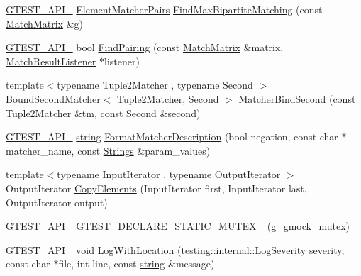 \begin{DoxyCompactItemize}
\item 
\hyperlink{gtest-port_8h_aa73be6f0ba4a7456180a94904ce17790}{G\+T\+E\+S\+T\+\_\+\+A\+P\+I\+\_\+} \hyperlink{namespacetesting_1_1internal_a0038618710c01a71150887dc7cfb0a29}{Element\+Matcher\+Pairs} \hyperlink{namespacetesting_1_1internal_ae30bd8357c179334b2b09b0d689efccc}{Find\+Max\+Bipartite\+Matching} (const \hyperlink{classtesting_1_1internal_1_1MatchMatrix}{Match\+Matrix} \&g)
\item 
\hyperlink{gtest-port_8h_aa73be6f0ba4a7456180a94904ce17790}{G\+T\+E\+S\+T\+\_\+\+A\+P\+I\+\_\+} bool \hyperlink{namespacetesting_1_1internal_af2bd2e350b56422a3d9d3b986ac1df0e}{Find\+Pairing} (const \hyperlink{classtesting_1_1internal_1_1MatchMatrix}{Match\+Matrix} \&matrix, \hyperlink{classtesting_1_1MatchResultListener}{Match\+Result\+Listener} $\ast$listener)
\item 
{\footnotesize template$<$typename Tuple2\+Matcher , typename Second $>$ }\\\hyperlink{classtesting_1_1internal_1_1BoundSecondMatcher}{Bound\+Second\+Matcher}$<$ Tuple2\+Matcher, Second $>$ \hyperlink{namespacetesting_1_1internal_a31eb77a2bb0ca713d6ef07d8a3b9af9e}{Matcher\+Bind\+Second} (const Tuple2\+Matcher \&tm, const Second \&second)
\item 
\hyperlink{gtest-port_8h_aa73be6f0ba4a7456180a94904ce17790}{G\+T\+E\+S\+T\+\_\+\+A\+P\+I\+\_\+} \hyperlink{namespacetesting_1_1internal_a8e8ff5b11e64078831112677156cb111}{string} \hyperlink{namespacetesting_1_1internal_a593b52fcbb46a765a31850661b1960f4}{Format\+Matcher\+Description} (bool negation, const char $\ast$matcher\+\_\+name, const \hyperlink{namespacetesting_1_1internal_a7706b17f05f4b49e351b052ae4e05073}{Strings} \&param\+\_\+values)
\item 
{\footnotesize template$<$typename Input\+Iterator , typename Output\+Iterator $>$ }\\Output\+Iterator \hyperlink{namespacetesting_1_1internal_a9372c12747bcf964aacb1284f8048cae}{Copy\+Elements} (Input\+Iterator first, Input\+Iterator last, Output\+Iterator output)
\item 
\hyperlink{gtest-port_8h_aa73be6f0ba4a7456180a94904ce17790}{G\+T\+E\+S\+T\+\_\+\+A\+P\+I\+\_\+} \hyperlink{namespacetesting_1_1internal_ae4d273e9b76b40a28483826518e68f17}{G\+T\+E\+S\+T\+\_\+\+D\+E\+C\+L\+A\+R\+E\+\_\+\+S\+T\+A\+T\+I\+C\+\_\+\+M\+U\+T\+E\+X\+\_\+} (g\+\_\+gmock\+\_\+mutex)
\item 
\hyperlink{gtest-port_8h_aa73be6f0ba4a7456180a94904ce17790}{G\+T\+E\+S\+T\+\_\+\+A\+P\+I\+\_\+} void \hyperlink{namespacetesting_1_1internal_af271cd1fc0b62a7f4736cb3109e86a37}{Log\+With\+Location} (\hyperlink{namespacetesting_1_1internal_a203d1a8a2147a53d12bbdae40d443914}{testing\+::internal\+::\+Log\+Severity} severity, const char $\ast$file, int line, const \hyperlink{namespacetesting_1_1internal_a8e8ff5b11e64078831112677156cb111}{string} \&message)

\end{DoxyCompactItemize}
